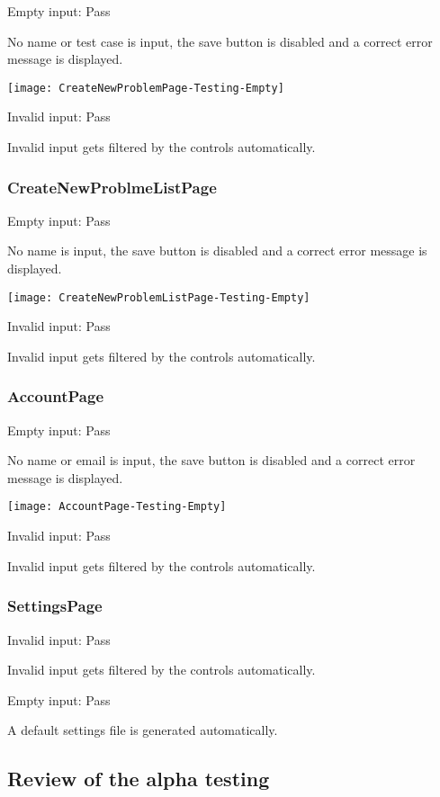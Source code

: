 \documentclass[report.tex]{subfiles}
\begin{document}
Empty input: Pass

No name or test case is input, the save button is disabled and a correct error message is displayed.

\texttt{[image: CreateNewProblemPage-Testing-Empty]}

Invalid input: Pass

Invalid input gets filtered by the controls automatically.

\subsubsection{CreateNewProblmeListPage}

Empty input: Pass

No name is input, the save button is disabled and a correct error message is displayed.

\texttt{[image: CreateNewProblemListPage-Testing-Empty]}

Invalid input: Pass

Invalid input gets filtered by the controls automatically.

\subsubsection{AccountPage}

Empty input: Pass

No name or email is input, the save button is disabled and a correct error message is displayed.

\texttt{[image: AccountPage-Testing-Empty]}

Invalid input: Pass

Invalid input gets filtered by the controls automatically.

\subsubsection{SettingsPage}

Invalid input: Pass

Invalid input gets filtered by the controls automatically.

Empty input: Pass

A default settings file is generated automatically.

\subsection{Review of the alpha testing}
\end{document}
